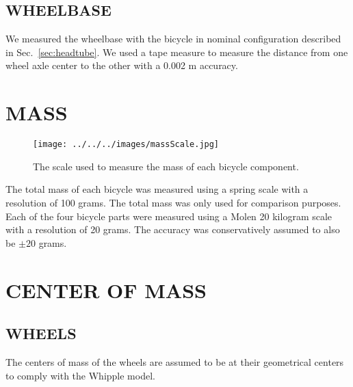 \documentclass{bmd2010p}
\begin{document}
\subsection{WHEELBASE}
We measured the wheelbase with the bicycle in nominal
configuration described in Sec.~\ref{sec:headtube}. We used a tape measure
to measure the distance from one wheel axle center to the other with a 0.002 m
accuracy.
\section{MASS}
\begin{figure}[tb]
    \begin{center}
        \texttt{[image: ../../../images/massScale.jpg]}
    \end{center}
    \caption{The scale used to measure the mass of each bicycle component.}
    \label{fig:massScale}
\end{figure}
The total mass of each bicycle was measured using a spring scale with a
resolution of 100 grams. The total mass was only used for comparison purposes.
Each of the four bicycle parts were measured using a Molen 20 kilogram scale with a
resolution of 20 grams. The accuracy was conservatively assumed to also be
$\pm20$ grams.
\section{CENTER OF MASS}
\subsection{WHEELS}
The centers of mass of the wheels are assumed to be at their geometrical
centers to comply with the Whipple model.
\end{document}
